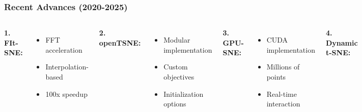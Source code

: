 \documentclass[aspectratio=169]{beamer}
\begin{document}
\begin{frame}
\frametitle{Recent Advances (2020-2025)}
\begin{columns}[T]
\textbf{1. FIt-SNE:}
\begin{itemize}
\small
\item FFT acceleration
\item Interpolation-based
\item 100x speedup
\end{itemize}

\vspace{0.3cm}
\textbf{2. openTSNE:}
\begin{itemize}
\small
\item Modular implementation
\item Custom objectives
\item Initialization options
\end{itemize}

\vspace{0.3cm}
\textbf{3. GPU-SNE:}
\begin{itemize}
\small
\item CUDA implementation
\item Millions of points
\item Real-time interaction
\end{itemize}

\textbf{4. Dynamic t-SNE:}
\begin{center}
\end{center}
For time-series embeddings

\vspace{0.3cm}
\textbf{5. Hierarchical t-SNE:}
\begin{itemize}
\small
\item Multi-scale visualization
\item Zoom in/out of clusters
\item Interactive exploration
\end{itemize}
\end{columns}
\end{frame}
\end{document}
